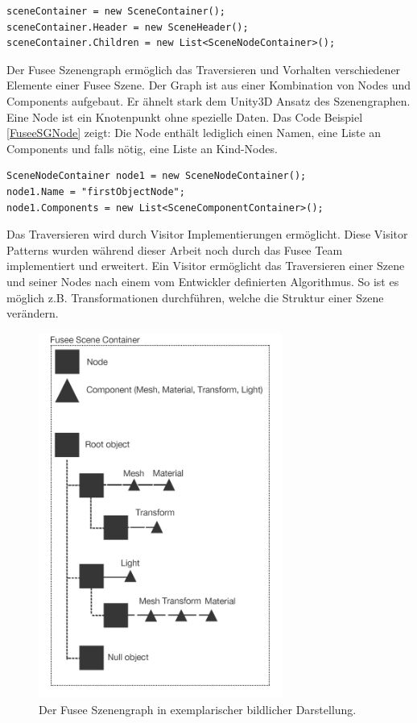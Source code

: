 \documentclass[pagesize, paper=a4, fontsize=12pt, titlepage=true, headings=small, headnosepline, abstractoff, liststotoc, nochapterprefix, plainheadsepline, twoside]{scrreprt}
\begin{document}
\begin{lstlisting}[caption = Anlegen eines Fusee SceneContainers und damit Verwendung des Szenengraphen., label=FuseeSGSceneContainer]
sceneContainer = new SceneContainer();
sceneContainer.Header = new SceneHeader();
sceneContainer.Children = new List<SceneNodeContainer>();
\end{lstlisting}

Der Fusee Szenengraph ermöglich das Traversieren und Vorhalten verschiedener Elemente einer Fusee Szene. Der Graph ist aus einer Kombination von Nodes und Components aufgebaut. Er ähnelt stark dem Unity3D Ansatz des Szenengraphen. Eine Node ist ein Knotenpunkt ohne spezielle Daten. Das Code Beispiel \ref{FuseeSGNode} zeigt: Die Node enthält lediglich einen Namen, eine Liste an Components und falls nötig, eine Liste an Kind-Nodes.

\begin{lstlisting}[caption = Anlegen eines Fusee Node Containers und initialisieren einer Component Liste., label=FuseeSGNode]
SceneNodeContainer node1 = new SceneNodeContainer();
node1.Name = "firstObjectNode";
node1.Components = new List<SceneComponentContainer>();
\end{lstlisting}

Das Traversieren wird durch Visitor Implementierungen ermöglicht. Diese Visitor Patterns wurden während dieser Arbeit noch durch das Fusee Team implementiert und erweitert. Ein Visitor ermöglicht das Traversieren einer Szene und seiner Nodes nach einem vom Entwickler definierten Algorithmus. So ist es möglich z.B. Transformationen durchführen, welche die Struktur einer Szene verändern.

\begin{figure}[ht]
	\centering
	\includegraphics[width=8cm]{Bilder/Fusee_Szenengraph_Vgl.jpg}
	\caption{Der Fusee Szenengraph in exemplarischer bildlicher Darstellung.}
	\label{FuseeSzenenGraph}
\end{figure}
\end{document}
